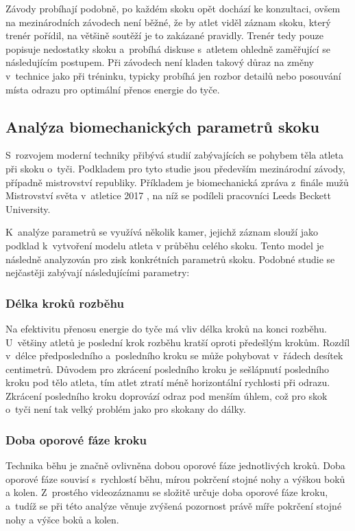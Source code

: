 Závody probíhají podobně, po každém skoku opět dochází ke konzultaci, ovšem na mezinárodních závodech není běžné, že by atlet viděl záznam skoku, který trenér pořídil, na většině soutěží je to zakázané pravidly. Trenér tedy pouze popisuje nedostatky skoku a~probíhá diskuse s~atletem ohledně zaměřující se následujícím postupem. Při závodech není kladen takový důraz na změny v~technice jako při tréninku, typicky probíhá jen rozbor detailů nebo posouvání místa odrazu pro optimální přenos energie do tyče.

\subsection{Analýza biomechanických parametrů skoku}

S~rozvojem moderní techniky přibývá studií zabývajících se pohybem těla atleta při skoku o~tyči. Podkladem pro tyto studie jsou především mezinárodní závody, případně mistrovství republiky. Příkladem je biomechanická zpráva z~finále mužů Mistrovství světa v~atletice 2017 \citep{IAAF2017}, na níž se podíleli pracovníci Leeds Beckett University.

K~analýze parametrů se využívá několik kamer, jejichž záznam slouží jako podklad k~vytvoření modelu atleta v průběhu celého skoku. Tento model je následně analyzován pro zisk konkrétních parametrů skoku. Podobné studie se nejčastěji zabývají následujícími parametry:

\subsubsection{Délka kroků rozběhu}

Na efektivitu přenosu energie do tyče má vliv délka kroků na konci rozběhu. U~většiny atletů je poslední krok rozběhu kratší oproti předešlým krokům. Rozdíl v~délce předposledního a~posledního kroku se může pohybovat v~řádech desítek centimetrů. Důvodem pro zkrácení posledního kroku je sešlápnutí posledního kroku pod tělo atleta, tím atlet ztratí méně horizontální rychlosti při odrazu. Zkrácení posledního kroku doprovází odraz pod menším úhlem, což pro skok o~tyči není tak velký problém jako pro skokany do dálky.

\subsubsection{Doba oporové fáze kroku}

Technika běhu je značně ovlivněna dobou oporové fáze jednotlivých kroků. Doba oporové fáze souvisí s~rychlostí běhu, mírou pokrčení stojné nohy a výškou boků a kolen. Z~prostého videozáznamu se složitě určuje doba oporové fáze kroku, a~tudíž se při této analýze věnuje zvýšená pozornost právě míře pokrčení stojné nohy a výšce boků a kolen.

